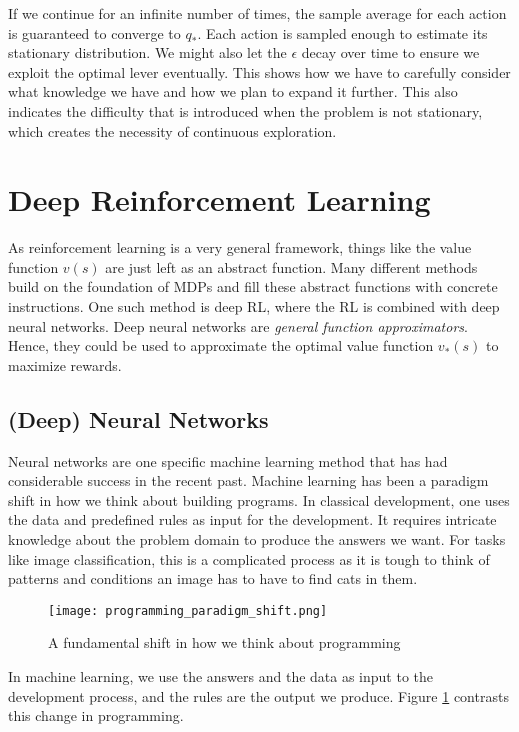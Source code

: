 If we continue for an infinite number of times, the sample average for each action is guaranteed to converge to $ q_{*} $. Each action is sampled enough to estimate its stationary distribution. We might also let the $ \epsilon $ decay over time to ensure we exploit the optimal lever eventually. This shows how we have to carefully consider what knowledge we have and how we plan to expand it further. This also indicates the difficulty that is introduced when the problem is not stationary, which creates the necessity of continuous exploration.

\section{Deep Reinforcement Learning}
As reinforcement learning is a very general framework, things like the value function $ v(s)$ are just left as an abstract function. Many different methods build on the foundation of MDPs and fill these abstract functions with concrete instructions. One such method is deep RL, where the RL is combined with deep neural networks. Deep neural networks are \textit{general function approximators}. Hence, they could be used to approximate the optimal value function $ v_{*}(s) $ to maximize rewards.

\subsection{(Deep) Neural Networks}
\label{neural_networks}

Neural networks are one specific machine learning method that has had considerable success in the recent past. Machine learning has been a paradigm shift in how we think about building programs. In classical development, one uses the data and predefined rules as input for the development. It requires intricate knowledge about the problem domain to produce the answers we want. For tasks like image classification, this is a complicated process as it is tough to think of patterns and conditions an image has to have to find cats in them.

\begin{figure}
    \centering
    \texttt{[image: programming\_paradigm\_shift.png]}
    \caption{A fundamental shift in how we think about programming \cite[cf. p. 5f.]{moroney_ai_2020}}
    \label{programming_paradigm_shift}
\end{figure}

In machine learning, we use the answers and the data as input to the development process, and the rules are the output we produce. Figure \ref{programming_paradigm_shift} contrasts this change in programming.

